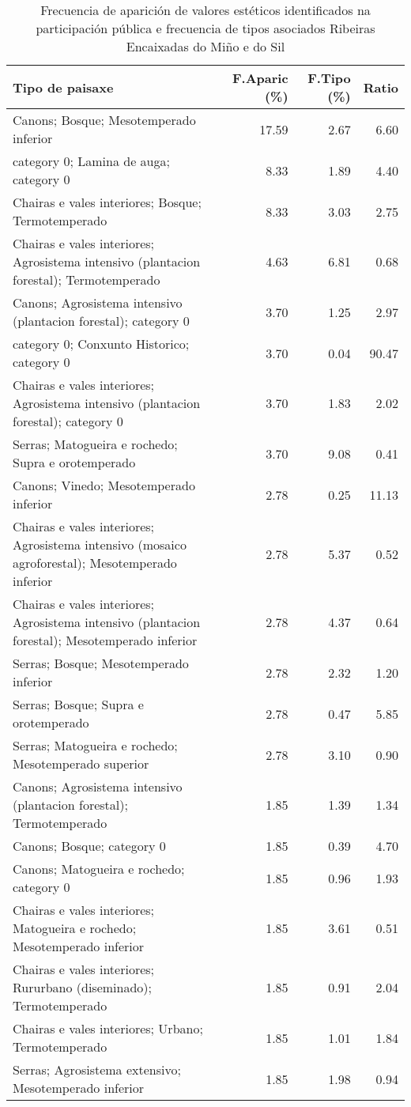 \begin{table}[p]
\centering
\caption{Frecuencia de aparición de valores estéticos identificados na participación pública e frecuencia de tipos asociados Ribeiras Encaixadas do Miño e do Sil} 
\label{vsixotest4}
\begin{tabular}{lrrr}
  \hline
Tipo de paisaxe & F.Aparic (\%) & F.Tipo (\%) & Ratio \\ 
  \hline
Canons; Bosque; Mesotemperado inferior & 17.59 & 2.67 & 6.60 \\ 
  category 0; Lamina de auga; category 0 & 8.33 & 1.89 & 4.40 \\ 
  Chairas e vales interiores; Bosque; Termotemperado & 8.33 & 3.03 & 2.75 \\ 
  Chairas e vales interiores; Agrosistema intensivo (plantacion forestal); Termotemperado & 4.63 & 6.81 & 0.68 \\ 
  Canons; Agrosistema intensivo (plantacion forestal); category 0 & 3.70 & 1.25 & 2.97 \\ 
  category 0; Conxunto Historico; category 0 & 3.70 & 0.04 & 90.47 \\ 
  Chairas e vales interiores; Agrosistema intensivo (plantacion forestal); category 0 & 3.70 & 1.83 & 2.02 \\ 
  Serras; Matogueira e rochedo; Supra e orotemperado & 3.70 & 9.08 & 0.41 \\ 
  Canons; Vinedo; Mesotemperado inferior & 2.78 & 0.25 & 11.13 \\ 
  Chairas e vales interiores; Agrosistema intensivo (mosaico agroforestal); Mesotemperado inferior & 2.78 & 5.37 & 0.52 \\ 
  Chairas e vales interiores; Agrosistema intensivo (plantacion forestal); Mesotemperado inferior & 2.78 & 4.37 & 0.64 \\ 
  Serras; Bosque; Mesotemperado inferior & 2.78 & 2.32 & 1.20 \\ 
  Serras; Bosque; Supra e orotemperado & 2.78 & 0.47 & 5.85 \\ 
  Serras; Matogueira e rochedo; Mesotemperado superior & 2.78 & 3.10 & 0.90 \\ 
  Canons; Agrosistema intensivo (plantacion forestal); Termotemperado & 1.85 & 1.39 & 1.34 \\ 
  Canons; Bosque; category 0 & 1.85 & 0.39 & 4.70 \\ 
  Canons; Matogueira e rochedo; category 0 & 1.85 & 0.96 & 1.93 \\ 
  Chairas e vales interiores; Matogueira e rochedo; Mesotemperado inferior & 1.85 & 3.61 & 0.51 \\ 
  Chairas e vales interiores; Rururbano (diseminado); Termotemperado & 1.85 & 0.91 & 2.04 \\ 
  Chairas e vales interiores; Urbano; Termotemperado & 1.85 & 1.01 & 1.84 \\ 
  Serras; Agrosistema extensivo; Mesotemperado inferior & 1.85 & 1.98 & 0.94 \\ 
   \hline
\end{tabular}
\end{table}
